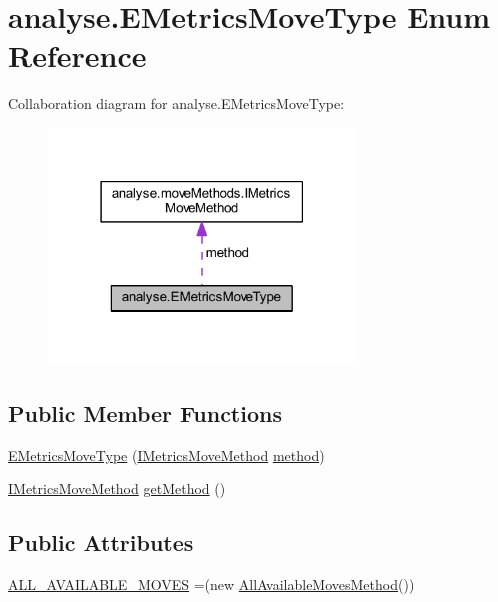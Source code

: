 \hypertarget{enumanalyse_1_1_e_metrics_move_type}{}\section{analyse.\+E\+Metrics\+Move\+Type Enum Reference}
\label{enumanalyse_1_1_e_metrics_move_type}


Collaboration diagram for analyse.\+E\+Metrics\+Move\+Type\+:
\nopagebreak
\begin{figure}[H]
\begin{center}
\leavevmode
\includegraphics[width=231pt]{enumanalyse_1_1_e_metrics_move_type__coll__graph}
\end{center}
\end{figure}
\subsection*{Public Member Functions}
\begin{DoxyCompactItemize}
\item 
\mbox{\hyperlink{enumanalyse_1_1_e_metrics_move_type_a9db417208cecac4b4e20d3adf4a18eec}{E\+Metrics\+Move\+Type}} (\mbox{\hyperlink{interfaceanalyse_1_1move_methods_1_1_i_metrics_move_method}{I\+Metrics\+Move\+Method}} \mbox{\hyperlink{enumanalyse_1_1_e_metrics_move_type_a003d08d23ab5a57a6736c1d1a13baa33}{method}})
\item 
\mbox{\hyperlink{interfaceanalyse_1_1move_methods_1_1_i_metrics_move_method}{I\+Metrics\+Move\+Method}} \mbox{\hyperlink{enumanalyse_1_1_e_metrics_move_type_aa8970fab2a06f13d314f9fc790c24048}{get\+Method}} ()
\end{DoxyCompactItemize}
\subsection*{Public Attributes}
\begin{DoxyCompactItemize}
\item 
\mbox{\hyperlink{enumanalyse_1_1_e_metrics_move_type_a6648e7e575bb97c1260b51746bc14a5a}{A\+L\+L\+\_\+\+A\+V\+A\+I\+L\+A\+B\+L\+E\+\_\+\+M\+O\+V\+ES}} =(new \mbox{\hyperlink{classanalyse_1_1move_methods_1_1_all_available_moves_method}{All\+Available\+Moves\+Method}}())
\end{DoxyCompactItemize}

